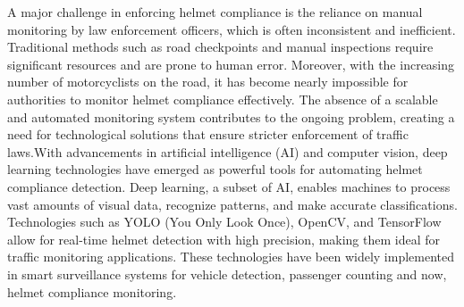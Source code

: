 \begin{refsection}
A major challenge in enforcing helmet compliance is the reliance on manual monitoring by law enforcement officers, which is often inconsistent and inefficient. Traditional methods such as road checkpoints and manual inspections require significant resources and are prone to human error. Moreover, with the increasing number of motorcyclists on the road, it has become nearly impossible for authorities to monitor helmet compliance effectively. The absence of a scalable and automated monitoring system contributes to the ongoing problem, creating a need for technological solutions that ensure stricter enforcement of traffic laws.With advancements in artificial intelligence (AI) and computer vision, deep learning technologies have emerged as powerful tools for automating helmet compliance detection. Deep learning, a subset of AI, enables machines to process vast amounts of visual data, recognize patterns, and make accurate classifications. Technologies such as YOLO (You Only Look Once), OpenCV, and TensorFlow allow for real-time helmet detection with high precision, making them ideal for traffic monitoring applications. These technologies have been widely implemented in smart surveillance systems for vehicle detection, passenger counting and now, helmet compliance monitoring.


\end{refsection}
